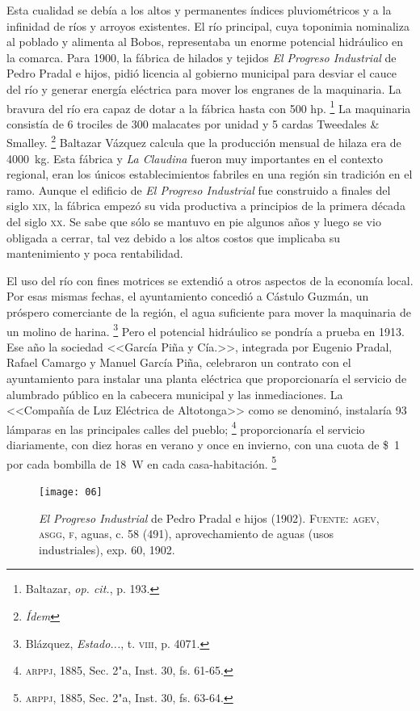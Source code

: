 \documentclass[14pt,twoside,final]{extbook} %
\let\oldfootnote\footnote
\renewcommand\footnote[1]{%
\oldfootnote{\hspace{1mm}#1}}
\begin{document}
Esta cualidad se debía a los altos y permanentes índices pluviométricos y a la infinidad de ríos y arroyos existentes. El río principal, cuya toponimia nominaliza al poblado y alimenta al Bobos, representaba un enorme potencial hidráulico en la comarca. Para 1900, la fábrica de hilados y tejidos \emph{El Progreso Industrial} de Pedro Pradal e hijos, pidió licencia al gobierno municipal para desviar el cauce del río y generar energía eléctrica para mover los engranes de la maquinaria. La bravura del río era capaz de dotar a la fábrica hasta con 500 hp.\footnote{Baltazar, \emph{op. cit.}, p. 193.} La maquinaria consistía de 6 trociles de 300 malacates por unidad y 5 cardas Tweedales \& Smalley.\footnote{\em Ídem} Baltazar Vázquez calcula que la producción mensual de hilaza era de 4000~kg. Esta fábrica y \emph{La Claudina} fueron muy importantes en el contexto regional, eran los únicos establecimientos fabriles en una región sin tradición en el ramo. Aunque el edificio de \emph{El Progreso Industrial} fue construido a finales del siglo \textsc{xix}, la fábrica empezó su vida productiva a principios de la primera década del siglo \textsc{xx}. Se sabe que sólo se mantuvo en pie algunos años y luego se vio obligada a cerrar, tal vez debido a los altos costos que implicaba su mantenimiento y poca rentabilidad.

El uso del río con fines motrices se extendió a otros aspectos de la economía local. Por esas mismas fechas, el ayuntamiento concedió a Cástulo Guzmán, un próspero comerciante de la región, el agua suficiente para mover la maquinaria de un molino de harina.\footnote{Blázquez, \emph{Estado...}, t. \textsc{viii}, p. 4071.} Pero el potencial hidráulico se pondría a prueba en 1913. Ese año la sociedad <<García Piña y Cía.>>, integrada por Eugenio Pradal, Rafael Camargo y Manuel García Piña, celebraron un contrato con el ayuntamiento para instalar una planta eléctrica que proporcionaría el servicio de alumbrado público en la cabecera municipal y las inmediaciones. La <<Compañía de Luz Eléctrica de Altotonga>> como se denominó, instalaría 93 lámparas en las principales calles del pueblo;\footnote{\textsc{arppj}, 1885, Sec. 2"a, Inst. 30, fs. 61-65.} proporcionaría el servicio diariamente, con diez horas en verano y once en invierno, con una cuota de \$~1 por cada bombilla de 18~W en cada casa-habitación.\footnote{\textsc{arppj}, 1885, Sec. 2"a, Inst. 30, fs. 63-64.}
\begin{figure}
\centering
\texttt{[image: 06]}
\caption[\emph{El Progreso Industrial} de Pedro Pradal e hijos (1902)]{\emph{El Progreso Industrial} de Pedro Pradal e hijos (1902). \textsc{Fuente:} \textsc{agev, asgg, f}, aguas, c. 58 (491), aprovechamiento de aguas (usos industriales), exp. 60, 1902.}
\label{fig:progreso-industrial}
\end{figure}
\end{document}
